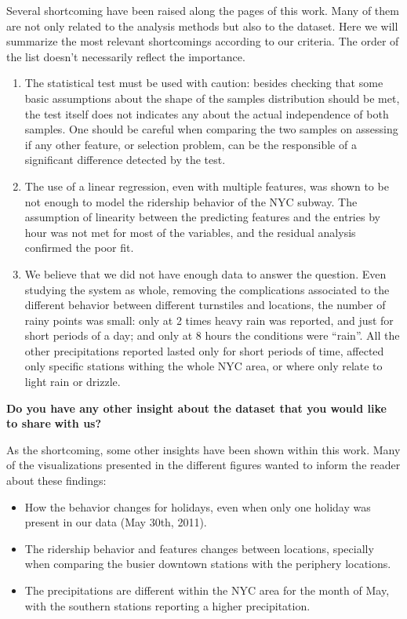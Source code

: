 \documentclass[a4paper,12pt,english]{sphinxmanual}
\begin{document}
Several shortcoming have been raised along the pages of this work. Many of them
are not only related to the analysis methods but also to the dataset. Here we will
summarize the most relevant shortcomings according to our criteria. The order of
the list doesn't necessarily reflect the importance.
\begin{enumerate}
\item {} 
The statistical test must be used with caution: besides checking that some
basic assumptions about the shape of the samples distribution should be met,
the test itself does not indicates any about the actual independence of both
samples. One should be careful when comparing the two samples on assessing
if any other feature, or selection problem, can be the responsible of a
significant difference detected by the test.

\item {} 
The use of a linear regression, even with multiple features, was shown to be
not enough to model the ridership behavior of the NYC subway. The assumption
of linearity between the predicting features and the entries by hour was not
met for most of the variables, and the residual analysis confirmed the poor
fit.

\item {} 
We believe that we did not have enough data to answer the question. Even
studying the system as whole, removing the complications associated to the
different behavior between different turnstiles and locations, the number
of rainy points was small: only at 2 times heavy rain was reported, and just
for short periods of a day; and only at 8 hours the conditions were ``rain''.
All the other precipitations reported lasted only for short periods of time,
affected only specific stations withing the whole NYC area, or where only
relate to light rain or drizzle.

\end{enumerate}

\textbf{Do you have any other insight about the dataset that you would like to share}
\textbf{with us?}

As the shortcoming, some other insights have been shown within this work. Many
of the visualizations presented in the different figures wanted to inform the
reader about these findings:
\begin{itemize}
\item {} 
How the behavior changes for holidays, even when only one holiday was present
in our data (May 30th, 2011).

\item {} 
The ridership behavior and features changes between locations, specially when
comparing the busier downtown stations with the periphery locations.

\item {} 
The precipitations are different within the NYC area for the month of May, with
the southern stations reporting a higher precipitation.

\end{itemize}
\end{document}
